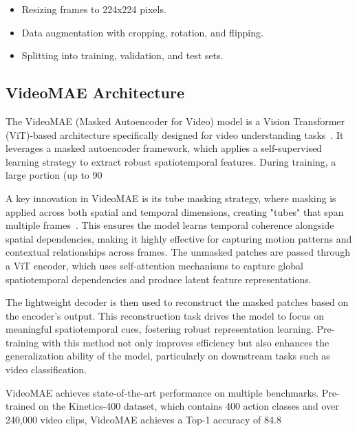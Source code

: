 \documentclass[runningheads]{llncs}
\begin{document}
	\begin{itemize}
		\item Resizing frames to 224x224 pixels.
		\item Data augmentation with cropping, rotation, and flipping.
		\item Splitting into training, validation, and test sets.
	\end{itemize}
	
\subsection{VideoMAE Architecture} \label{sec:architecture}
The VideoMAE (Masked Autoencoder for Video) model is a Vision Transformer (ViT)-based architecture specifically designed for video understanding tasks~\cite{videomae_paper}. It leverages a masked autoencoder framework, which applies a self-supervised learning strategy to extract robust spatiotemporal features. During training, a large portion (up to 90%

A key innovation in VideoMAE is its tube masking strategy, where masking is applied across both spatial and temporal dimensions, creating "tubes" that span multiple frames~\cite{videomae_paper}. This ensures the model learns temporal coherence alongside spatial dependencies, making it highly effective for capturing motion patterns and contextual relationships across frames. The unmasked patches are passed through a ViT encoder, which uses self-attention mechanisms to capture global spatiotemporal dependencies and produce latent feature representations.

The lightweight decoder is then used to reconstruct the masked patches based on the encoder's output. This reconstruction task drives the model to focus on meaningful spatiotemporal cues, fostering robust representation learning. Pre-training with this method not only improves efficiency but also enhances the generalization ability of the model, particularly on downstream tasks such as video classification.

VideoMAE achieves state-of-the-art performance on multiple benchmarks. Pre-trained on the Kinetics-400 dataset, which contains 400 action classes and over 240,000 video clips, VideoMAE achieves a Top-1 accuracy of 84.8%
\end{document}

